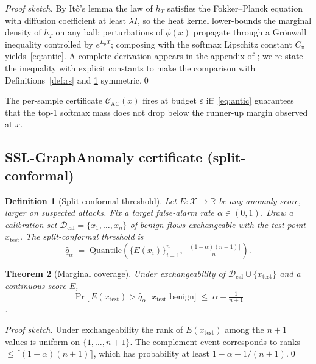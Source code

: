 \documentclass[journal,twoside]{IEEEtran}
\newtheorem{theorem}{Theorem}
\newtheorem{definition}[theorem]{Definition}
\begin{document}
\emph{Proof sketch.} By It\^o's lemma the law of $h_T$ satisfies the
Fokker--Planck equation with diffusion coefficient at least $\lambda I$,
so the heat kernel lower-bounds the marginal density of $h_T$ on any
ball; perturbations of $\phi(x)$ propagate through a Gr\"onwall
inequality controlled by $e^{L_\mu T}$; composing with the softmax
Lipschitz constant $C_\pi$ yields~\eqref{eq:antic}. A complete
derivation appears in the appendix of \cite{chen2024sdeguard}; we
re-state the inequality with explicit constants to make the comparison
with Definitions~\ref{def:rs} and \ref{def:conformal} symmetric.\qed

The per-sample certificate $\mathcal{C}_{\mathrm{AC}}(x)$ fires at
budget $\varepsilon$ iff~\eqref{eq:antic} guarantees that the top-1
softmax mass does not drop below the runner-up margin observed at $x$.

\subsection{SSL-GraphAnomaly certificate (split-conformal)}

\begin{definition}[Split-conformal threshold]
\label{def:conformal}
Let $E : \mathcal{X} \to \mathbb{R}$ be any anomaly score, larger on
suspected attacks. Fix a target false-alarm rate $\alpha \in (0,1)$.
Draw a calibration set
$\mathcal{D}_{\mathrm{cal}} = \{x_1,\dots,x_n\}$ of benign flows
exchangeable with the test point $x_{\mathrm{test}}$. The
split-conformal threshold is
\begin{equation}
\hat{q}_\alpha \;=\; \mathrm{Quantile}\!\left(
\bigl\{E(x_i)\bigr\}_{i=1}^n,\;
\tfrac{\lceil (1-\alpha)(n+1)\rceil}{n}
\right).
\end{equation}
\end{definition}

\begin{theorem}[Marginal coverage]
\label{thm:coverage}
Under exchangeability of $\mathcal{D}_{\mathrm{cal}} \cup
\{x_{\mathrm{test}}\}$ and a continuous score $E$,
\begin{equation}
\Pr\!\bigl[\,E(x_{\mathrm{test}}) > \hat{q}_\alpha
\,\big|\, x_{\mathrm{test}} \text{ benign}\bigr]
\;\le\; \alpha + \tfrac{1}{n+1}
\end{equation}
\cite{vovk2005algorithmic,angelopoulos2023gentle}.
\end{theorem}

\emph{Proof sketch.} Under exchangeability the rank of
$E(x_{\mathrm{test}})$ among the $n+1$ values is uniform on
$\{1,\dots,n+1\}$. The complement event corresponds to ranks
$\le \lceil (1-\alpha)(n+1)\rceil$, which has probability at least
$1-\alpha-1/(n+1)$.\qed
\end{document}
